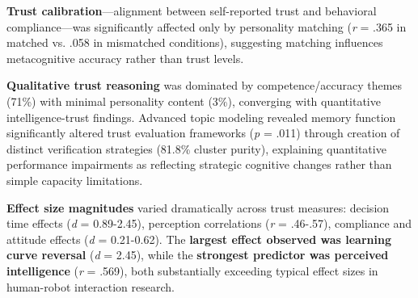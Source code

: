 \documentclass[12pt]{article}
\begin{document}
\textbf{Trust calibration}---alignment between self-reported trust and behavioral compliance---was significantly affected only by personality matching (\textit{r} = .365 in matched vs. .058 in mismatched conditions), suggesting matching influences metacognitive accuracy rather than trust levels.

\textbf{Qualitative trust reasoning} was dominated by competence/accuracy themes (71\%) with minimal personality content (3\%), converging with quantitative intelligence-trust findings. Advanced topic modeling revealed memory function significantly altered trust evaluation frameworks (\textit{p} = .011) through creation of distinct verification strategies (81.8\% cluster purity), explaining quantitative performance impairments as reflecting strategic cognitive changes rather than simple capacity limitations.

\textbf{Effect size magnitudes} varied dramatically across trust measures: decision time effects (\textit{d} = 0.89-2.45), perception correlations (\textit{r} = .46-.57), compliance and attitude effects (\textit{d} = 0.21-0.62). The \textbf{largest effect observed was learning curve reversal} (\textit{d} = 2.45), while the \textbf{strongest predictor was perceived intelligence} (\textit{r} = .569), both substantially exceeding typical effect sizes in human-robot interaction research.



\end{document}
